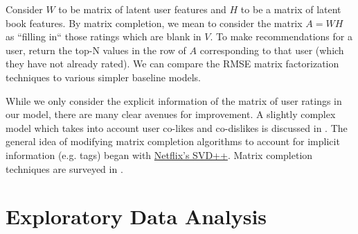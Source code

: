 \documentclass[11pt]{article}
\begin{document}
Consider $W$ to be matrix of latent user features and $H$ to be a matrix of latent book features. By matrix completion, we mean to consider the matrix $A = WH$ as ``filling in`` those ratings which are blank in $V$.
To make recommendations for a user, return the top-N values in the row of $A$ corresponding to that user (which they have not already rated). We can compare the RMSE matrix factorization techniques to various simpler baseline models.

While we only consider the explicit information of the matrix of user ratings in our model, there are many clear avenues for improvement. A slightly complex model which takes into account user co-likes and co-dislikes is discussed in \cite{tranRegularizingMatrixFactorization2018}. The general idea of modifying matrix completion algorithms to account for implicit information (e.g. tags) began with \href{https://en.wikipedia.org/wiki/Matrix_factorization_(recommender_systems)#SVD++}{Netflix's SVD++}. Matrix completion techniques are surveyed in \cite{ramlatchanSurveyMatrixCompletion2018}.





    \hypertarget{exploratory-data-analysis}{%
\section{Exploratory Data Analysis}\label{exploratory-data-analysis}}
   
\end{document}
